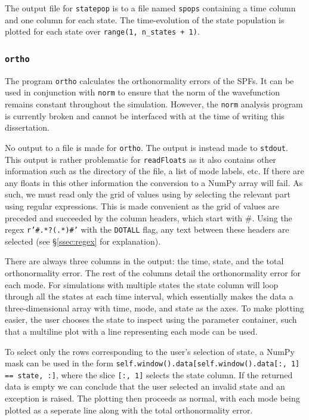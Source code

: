 \documentclass[12pt]{article}
\begin{document}
The output file for \texttt{statepop} is to a file named \texttt{spops} containing a time column and one column for each state. The time-evolution of the state population is plotted for each state over \texttt{range(1, n_states + 1)}.

\subsubsection{\texttt{ortho}}\label{sssec:ortho}

The program \texttt{ortho} calculates the orthonormality errors of the SPFs. It can be used in conjunction with \texttt{norm} to ensure that the norm of the wavefunction remains constant throughout the simulation. However, the \texttt{norm} analysis program is currently broken and cannot be interfaced with at the time of writing this dissertation.

No output to a file is made for \texttt{ortho}. The output is instead made to \texttt{stdout}. This output is rather problematic for \texttt{readFloats} as it also contains other information such as the directory of the file, a list of mode labels, etc. If there are any floats in this other information the conversion to a NumPy array will fail. As such, we must read only the grid of values using by selecting the relevant part using regular expressions. This is made convenient as the grid of values are preceded and succeeded by the column headers, which start with \#. Using the regex \texttt{r'#.*?\n(.*)#'} with the \texttt{DOTALL} flag, any text between these headers are selected (see \S\ref{ssec:regex} for explanation).

There are always three columns in the output: the time, state, and the total orthonormality error. The rest of the columns detail the orthonormality error for each mode. For simulations with multiple states the state column will loop through all the states at each time interval, which essentially makes the data a three-dimensional array with time, mode, and state as the axes. To make plotting easier, the user chooses the state to inspect using the parameter container, such that a multiline plot with a line representing each mode can be used.

To select only the rows corresponding to the user's selection of state, a NumPy mask can be used in the form \texttt{self.window().data[self.window().data[:, 1] == state, :]}, where the slice \texttt{[:, 1]} selects the state column. If the returned data is empty we can conclude that the user selected an invalid state and an exception is raised. The plotting then proceeds as normal, with each mode being plotted as a seperate line along with the total orthonormality error.
\end{document}
